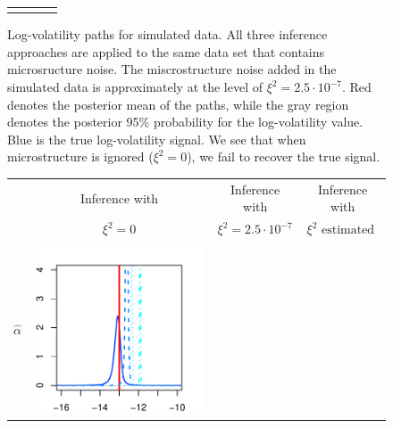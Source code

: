 \documentclass[10pt]{article}
\newcommand{\halpha}{\hat{\alpha}}
\begin{document}
\begin{figure}
\begin{tabular}{m{0.25cm}ccc}
\begin{minipage}{0.25\textwidth}
				\end{minipage}
	\end{tabular}
\caption{Log-volatility paths for simulated data. All three inference approaches are applied to the same data set that contains microsructure noise. The miscrostructure noise added in the simulated data is approximately at the level of $\xi^2 = 2.5\cdot 10^{-7}$. Red denotes the posterior mean of the paths, while the gray region denotes the posterior 95\% probability for the log-volatility value. Blue is the true log-volatility signal. We see that when microstructure is ignored ($\xi^2 = 0$), we fail to recover the true signal.}  \label{fig:log-vol-simulation}
\end{figure}

\begin{figure}[h!]
\centering
\begin{tabular}{m{0.25cm}ccc}
		 & Inference with & Inference with & Inference with \\
		 & $\xi^2 = 0$ & $\xi^2 = 2.5 \cdot 10^{-7}$ & $\xi^2 \mbox{ estimated }$ \\
%
		\begin{sideways} $\halpha$ \end{sideways}
			& \begin{minipage}{0.20\textwidth}
				\centering
				\includegraphics[width=1\linewidth]{results-simulation-10003-bid-ask-noise-plots-ALPHAS-microstructure-ALPHA-XI-0-SDs-0.pdf}

\end{minipage}
\end{tabular}
\end{figure}
\end{document}
